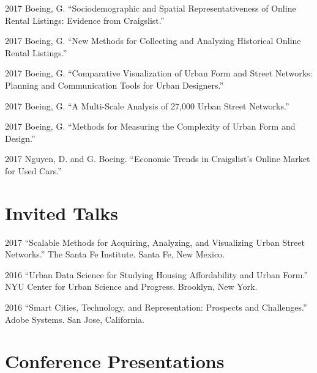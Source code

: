 \documentclass{academiccv}
\begin{document}
\begin{tablist}

\item[2017] \tab Boeing, G. \enquote{Sociodemographic and Spatial Representativeness of Online Rental Listings: Evidence from Craigslist.}

\item[2017] \tab Boeing, G. \enquote{New Methods for Collecting and Analyzing Historical Online Rental Listings.}

\item[2017] \tab Boeing, G. \enquote{Comparative Visualization of Urban Form and Street Networks: Planning and Communication Tools for Urban Designers.}

\item[2017] \tab Boeing, G. \enquote{A Multi-Scale Analysis of 27,000 Urban Street Networks.}

\item[2017] \tab Boeing, G. \enquote{Methods for Measuring the Complexity of Urban Form and Design.}

\item[2017] \tab Nguyen, D. and G. Boeing. \enquote{Economic Trends in Craigslist's Online Market for Used Cars.}

\end{tablist}



\section*{Invited Talks}

\begin{tablist}

\item[2017] \tab \enquote{Scalable Methods for Acquiring, Analyzing, and Visualizing Urban Street Networks.} The Santa Fe Institute. Santa Fe, New Mexico.

\item[2016] \tab \enquote{Urban Data Science for Studying Housing Affordability and Urban Form.} NYU Center for Urban Science and Progress. Brooklyn, New York.

\item[2016] \tab \enquote{Smart Cities, Technology, and Representation: Prospects and Challenges.} Adobe Systems. San Jose, California.

\end{tablist}



\section*{Conference Presentations}
\end{document}
